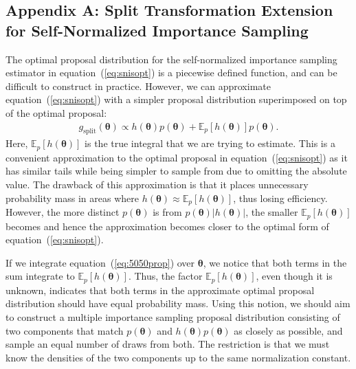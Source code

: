 \documentclass[12pt]{article}
\newenvironment{nalign}{
    \begin{equation}
    \begin{aligned}
}{
    \end{aligned}
    \end{equation}
    \ignorespacesafterend
}
\begin{document}
\subsection*{Appendix A: Split Transformation Extension for Self-Normalized Importance Sampling}



The optimal proposal distribution for the self-normalized importance sampling estimator in equation~(\ref{eq:snisopt}) is a piecewise defined function,
%
and can be difficult
to construct in practice.
%
%
However, we can approximate equation~(\ref{eq:snisopt}) with a simpler proposal distribution
superimposed on top of the optimal proposal:
\begin{nalign} \label{eq:5050prop}
g_{\text{split}} (\boldsymbol{\theta}) \propto h(\boldsymbol{\theta}) p (\boldsymbol{\theta})  + \mathbb{E}_p [h(\boldsymbol{\theta})] p (\boldsymbol{\theta}) .
\end{nalign}
Here, $\mathbb{E}_p [h(\boldsymbol{\theta})]$ is the true integral
%
that we are trying to estimate.
This is a convenient approximation to the optimal proposal in equation~(\ref{eq:snisopt}) as it has
similar tails while being simpler to sample from
due to omitting the absolute value.
The drawback of this approximation is that it places unnecessary probability mass in areas where
$h(\boldsymbol{\theta}) \approx \mathbb{E}_p [h(\boldsymbol{\theta})]$, thus losing efficiency.
However, the more distinct $p (\boldsymbol{\theta})$ is from
$p (\boldsymbol{\theta}) |h (\boldsymbol{\theta})|$, the smaller
$\mathbb{E}_p [h(\boldsymbol{\theta})]$ becomes and hence the approximation becomes closer to the optimal form
of equation~(\ref{eq:snisopt}).





If we integrate equation~(\ref{eq:5050prop}) over $\boldsymbol{\theta}$, we notice that
both terms in the sum integrate to $\mathbb{E}_p [h(\boldsymbol{\theta})]$.
Thus, the factor $\mathbb{E}_p [h(\boldsymbol{\theta})]$, even though it is unknown, indicates that both terms in the approximate optimal proposal distribution should
have equal probability mass.
Using this notion, we should aim to construct a multiple importance sampling proposal distribution
consisting of two components that match $p (\boldsymbol{\theta})$ and
$h(\boldsymbol{\theta}) p (\boldsymbol{\theta})$ as closely as possible, and
sample an equal number of draws from both. The restriction is that
we must know the densities of the two components up to the same normalization constant.
\end{document}
